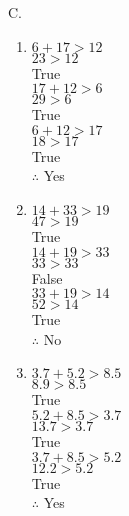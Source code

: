 \begin{multicols}{2}
C. 
\begin{enumerate}[label = \arabic*. ]
\item %
$ 6+17 > 12 $ \redcheck \\
$ 23>12 $ \redcheck \\
True \redcheck \\

$ 17+12 > 6 $ \redcheck \\
$ 29>6 $ \redcheck \\
True \redcheck \\

$ 6+12 > 17 $ \redcheck \\
$ 18>17 $ \redcheck \\
True \redcheck \\
$\therefore$ Yes \redcheck 

\item %
$ 14+33 >19 $ \redcheck \\
$ 47>19 $ \redcheck \\
True \redcheck \\

$ 14+19 >33 $ \redcheck \\
$ 33>33 $ \redcheck \\
False  \redcheck \\

$ 33+19 >14 $ \redcheck \\
$ 52>14 $ \redcheck \\
True \redcheck \\
$\therefore$ No \redcheck 

\item %
$ 3.7+5.2 >8.5 $ \redcheck \\
$ 8.9>8.5 $ \redcheck \\
True \redcheck \\

$ 5.2+8.5 >3.7 $ \redcheck \\
$ 13.7>3.7 $ \redcheck \\
True \redcheck \\

$ 3.7+8.5 >5.2 $ \redcheck \\
$ 12.2>5.2 $ \redcheck \\
True \redcheck \\
$\therefore$ Yes \redcheck 

\end{enumerate}  

\end{multicols} 